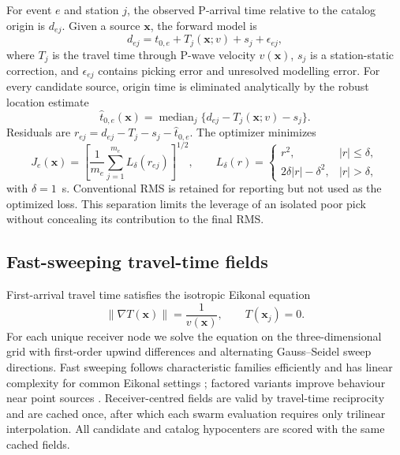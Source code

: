 \documentclass[10pt]{article}
\begin{document}
For event $e$ and station $j$, the observed P-arrival time relative to the catalog origin is $d_{ej}$. Given a source $\bm{x}$, the forward model is
\begin{equation}
 d_{ej}=t_{0,e}+T_j(\bm{x};v)+s_j+\epsilon_{ej},
\end{equation}
where $T_j$ is the travel time through P-wave velocity $v(\bm{x})$, $s_j$ is a station-static correction, and $\epsilon_{ej}$ contains picking error and unresolved modelling error. For every candidate source, origin time is eliminated analytically by the robust location estimate
\begin{equation}
 \widehat{t}_{0,e}(\bm{x})=\operatorname{median}_j\{d_{ej}-T_j(\bm{x};v)-s_j\}.
\end{equation}
Residuals are $r_{ej}=d_{ej}-T_j-s_j-\widehat{t}_{0,e}$. The optimizer minimizes
\begin{equation}
 J_e(\bm{x})=\left[\frac{1}{m_e}\sum_{j=1}^{m_e} L_\delta(r_{ej})\right]^{1/2},\qquad
 L_\delta(r)=\begin{cases}r^2,&|r|\leq\delta,\\2\delta|r|-\delta^2,&|r|>\delta,\end{cases}
\end{equation}
with $\delta=1$~s. Conventional RMS is retained for reporting but not used as the optimized loss. This separation limits the leverage of an isolated poor pick without concealing its contribution to the final RMS.

\subsection{Fast-sweeping travel-time fields}

First-arrival travel time satisfies the isotropic Eikonal equation
\begin{equation}
 \|\nabla T(\bm{x})\|=\frac{1}{v(\bm{x})},\qquad T(\bm{x}_j)=0.
\end{equation}
For each unique receiver node we solve the equation on the three-dimensional grid with first-order upwind differences and alternating Gauss--Seidel sweep directions. Fast sweeping follows characteristic families efficiently and has linear complexity for common Eikonal settings \citep{Zhao2005}; factored variants improve behaviour near point sources \citep{Fomel2009}. Receiver-centred fields are valid by travel-time reciprocity and are cached once, after which each swarm evaluation requires only trilinear interpolation. All candidate and catalog hypocenters are scored with the same cached fields.
\end{document}
